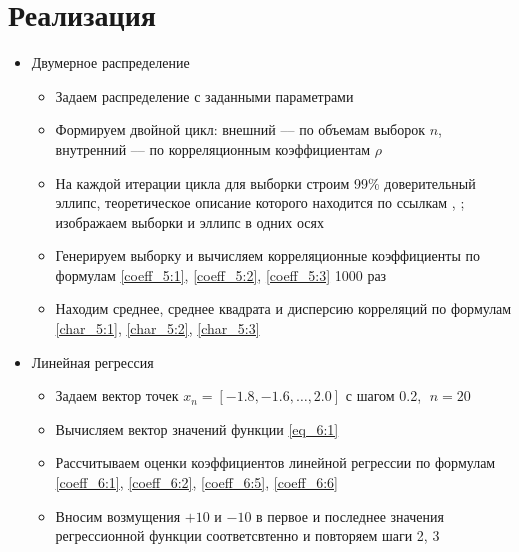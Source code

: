 \documentclass[12pt]{article}
\begin{document}


\section*{Реализация}


\begin{itemize}
    \item Двумерное распределение
    \begin{itemize}
        \item Задаем распределение с заданными параметрами 
        \item Формируем двойной цикл: внешний –– по объемам выборок $n$, внутренний –– по корреляционным коэффициентам $\rho$
        \item На каждой итерации цикла для выборки строим 99\% доверительный эллипс, теоретическое описание которого находится по ссылкам \cite{ms_1}, \cite{ms_3}; изображаем выборки и эллипс в одних осях
        \item Генерируем выборку и вычисляем корреляционные коэффициенты по формулам \eqref{coeff_5:1}, \eqref{coeff_5:2}, \eqref{coeff_5:3} 1000 раз 
        \item Находим среднее, среднее квадрата и дисперсию корреляций по формулам \eqref{char_5:1}, \eqref{char_5:2}, \eqref{char_5:3}
    \end{itemize}
    \item Линейная регрессия
    \begin{itemize}
        \item Задаем вектор точек $x_n = [-1.8, -1.6, \ldots, 2.0]$ с шагом 0.2, $ \; n = 20$ 
        \item Вычисляем вектор значений функции \eqref{eq_6:1}
        \item Рассчитываем оценки коэффициентов линейной регрессии по формулам \eqref{coeff_6:1}, \eqref{coeff_6:2}, \eqref{coeff_6:5}, \eqref{coeff_6:6} 
        \item Вносим возмущения $+10$ и $-10$ в первое и последнее значения регрессионной функции соответсвтенно и повторяем шаги 2, 3

\end{itemize}
\end{itemize}
\end{document}
